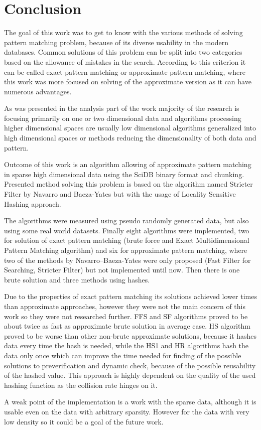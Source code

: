 \chapter{Conclusion} \label{conclusion}
The goal of this work was to get to know with the various methods of solving pattern matching problem, because of its diverse usability in the modern databases. Common solutions of this problem can be split into two categories based on the allowance of mistakes in the search. According to this criterion it can be called exact pattern matching or approximate pattern matching, where this work was more focused on solving of the approximate version as it can have numerous advantages. 

As was presented in the analysis part of the work majority of the research is focusing primarily on one or two dimensional data and algorithms processing higher dimensional spaces are usually low dimensional algorithms generalized into high dimensional spaces or methods reducing the dimensionality of both data and pattern. 

Outcome of this work is an algorithm allowing of approximate pattern matching in sparse high dimensional data using the SciDB binary format and chunking. Presented method solving this problem is based on the algorithm named Stricter Filter by Navarro and Baeza-Yates but with the usage of Locality Sensitive Hashing approach. 

The algorithms were measured using pseudo randomly generated data, but also using some real world datasets. Finally eight algorithms were implemented, two for solution of exact pattern matching (brute force and Exact Multidimensional Pattern Matching algorithm) and six for approximate pattern matching, where two of the methods by Navarro--Baeza-Yates were only proposed (Fast Filter for Searching, Stricter Filter) but not implemented until now. Then there is one brute solution and three methods using hashes.

Due to the properties of exact pattern matching its solutions achieved lower times than approximate approaches, however they were not the main concern of this work so they were not researched further.
FFS and SF algorithms proved to be about twice as fast as approximate brute solution in average case.
HS algorithm proved to be worse than other non-brute approximate solutions, because it hashes data every time the hash is needed, while the HS1 and HR algorithms hash the data only once which can improve the time needed for finding of the possible solutions to preverification and dynamic check, because of the possible reusability of the hashed value. This approach is highly dependent on the quality of the used hashing function as the collision rate hinges on it.

A weak point of the implementation is a work with the sparse data, although it is usable even on the data with arbitrary sparsity. However for the data with very low density so it could be a goal of the future work. 